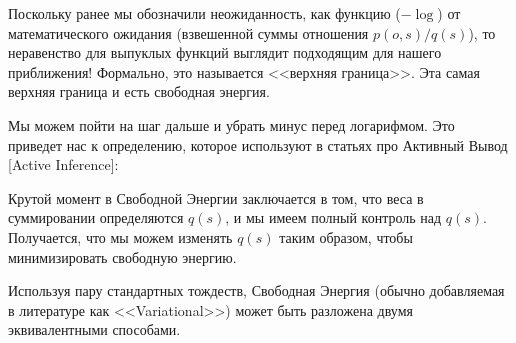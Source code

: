 \documentclass[twoside,leqno, 11pt]{article}
\begin{document}
	Поскольку ранее мы обозначили неожиданность, как функцию ($-\log$) от математического ожидания (взвешенной суммы отношения $p(o, s) / q(s)$), то неравенство для выпуклых функций выглядит подходящим для нашего приближения! Формально, это называется <<верхняя граница>>. Эта самая верхняя граница и есть свободная энергия.
	
	\begin{figure}[h]
		\label{ris:image}
	\end{figure}
	
	Мы можем пойти на шаг дальше и убрать минус перед логарифмом. Это приведет нас к определению, которое используют в статьях про Активный Вывод [Active Inference]:
	
	\begin{figure}[h]
		\label{ris:image}
	\end{figure}
	
	Крутой момент в Свободной Энергии заключается в том, что веса в суммировании определяются $q(s)$, и мы имеем полный контроль над $q(s)$. Получается, что мы можем изменять $q(s)$ таким образом, чтобы минимизировать свободную энергию.
	
	Используя пару стандартных тождеств, Свободная Энергия (обычно добавляемая в литературе как <<Variational>>) может быть разложена двумя эквивалентными способами.
	
\end{document}
